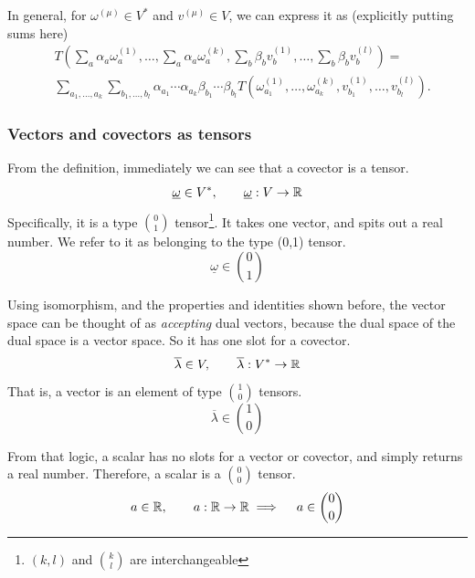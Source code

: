 		In general, for $\omega^{(\mu)}\in V^*$ and $v^{(\mu)} \in V$, we can express it as (explicitly putting sums here)
		\begin{align*}
			&T\left(
			\sum_a \alpha_a \omega_a^{(1)},
			\ldots,
			\sum_a \alpha_a \omega_a^{(k)},
			\sum_b \beta_b v_b^{(1)},
			\ldots,
			\sum_b \beta_b v_b^{(l)}
			\right)
			=\\
			&\sum_{a_1,\ldots,a_k}
			\sum_{b_1,\ldots,b_l}
			\alpha_{a_1}\cdots\alpha_{a_k}
			\beta_{b_1}\cdots\beta_{b_l}
			T\left(
			\omega_{a_1}^{(1)},\ldots,\omega_{a_k}^{(k)},
			v_{b_1}^{(1)},\ldots,v_{b_l}^{(l)}
			\right).
		\end{align*}

	\subsubsection{Vectors and covectors as tensors}
		From the definition, immediately we can see that a covector
		is a tensor.
		\[
			\underline{\omega} \in V^*,\qquad \underline{\omega}:V\to\mathbb{R}
		\]
		Specifically, it is a type $\binom{0}{1}$ tensor\footnote{$(k,l)$ and $\binom{k}{l}$ are interchangeable}. It takes one vector, 
		and spits out a real number. We refer to it as belonging to the type (0,1) tensor. 
		\[
			\underline\omega \in \binom{0}{1}
		\]

		Using isomorphism, and the properties and identities shown before, the vector space can
		be thought of as \textit{accepting} dual vectors, because the dual space of the dual space
		is a vector space. So it has one slot for a covector. 
		\[
			\overline{\lambda}\in V,\qquad \overline{\lambda}: V^* \to \mathbb{R}
		\]
		That is, a vector is an element of type $\binom{1}{0}$ tensors.
		\[
			\overline{\lambda}\in\binom{1}{0}
		\]
		
		From that logic, a scalar has no slots for a vector or covector, and simply returns a real number.
		Therefore, a scalar is a $\binom{0}{0}$ tensor.
		\[
			a\in\mathbb{R}, \qquad a:\mathbb{R}\to\mathbb{R} \implies \quad a\in \binom{0}{0}
		\]

